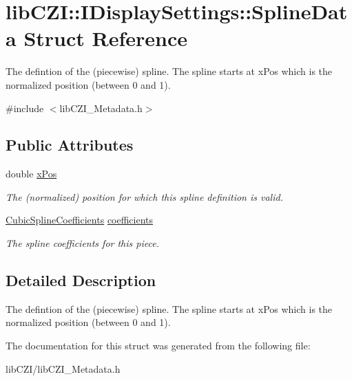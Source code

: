 \hypertarget{structlib_c_z_i_1_1_i_display_settings_1_1_spline_data}{}\section{lib\+C\+ZI\+:\+:I\+Display\+Settings\+:\+:Spline\+Data Struct Reference}
\label{structlib_c_z_i_1_1_i_display_settings_1_1_spline_data}


The defintion of the (piecewise) spline. The spline starts at {\ttfamily x\+Pos} which is the normalized position (between 0 and 1).  




{\ttfamily \#include $<$lib\+C\+Z\+I\+\_\+\+Metadata.\+h$>$}

\subsection*{Public Attributes}
\begin{DoxyCompactItemize}
\item 
\mbox{\label{structlib_c_z_i_1_1_i_display_settings_1_1_spline_data_a745dd0b033824f68be93d3b038d6ed41}} 
double \hyperlink{structlib_c_z_i_1_1_i_display_settings_1_1_spline_data_a745dd0b033824f68be93d3b038d6ed41}{x\+Pos}
\begin{DoxyCompactList}\small\item\em The (normalized) position for which this spline definition is valid. \end{DoxyCompactList}\item 
\mbox{\label{structlib_c_z_i_1_1_i_display_settings_1_1_spline_data_a2daa2f1b10f4bf574f13e4fd699c5b33}} 
\hyperlink{structlib_c_z_i_1_1_i_display_settings_1_1_cubic_spline_coefficients}{Cubic\+Spline\+Coefficients} \hyperlink{structlib_c_z_i_1_1_i_display_settings_1_1_spline_data_a2daa2f1b10f4bf574f13e4fd699c5b33}{coefficients}
\begin{DoxyCompactList}\small\item\em The spline coefficients for this piece. \end{DoxyCompactList}\end{DoxyCompactItemize}


\subsection{Detailed Description}
The defintion of the (piecewise) spline. The spline starts at {\ttfamily x\+Pos} which is the normalized position (between 0 and 1). 

The documentation for this struct was generated from the following file\+:\begin{DoxyCompactItemize}
\item 
lib\+C\+Z\+I/lib\+C\+Z\+I\+\_\+\+Metadata.\+h\end{DoxyCompactItemize}
